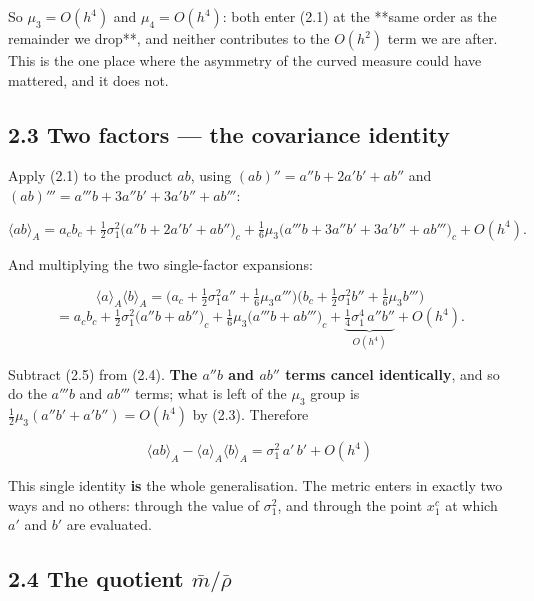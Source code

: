 \documentclass[11pt,a4paper]{article}
\begin{document}
So $\mu_3 = O(h^4)$ and $\mu_4 = O(h^4)$: both enter (2.1) at the **same order as
the remainder we drop**, and neither contributes to the $O(h^2)$ term we are
after. This is the one place where the asymmetry of the curved measure could
have mattered, and it does not.

\subsection*{2.3 Two factors — the covariance identity}

Apply (2.1) to the product $ab$, using
$(ab)''=a''b+2a'b'+ab''$ and
$(ab)'''=a'''b+3a''b'+3a'b''+ab'''$:

\begin{equation*}
\langle ab\rangle_A = a_cb_c
+ \tfrac12\sigma_1^2\big(a''b+2a'b'+ab''\big)_c
+ \tfrac16\mu_3\big(a'''b+3a''b'+3a'b''+ab'''\big)_c
+ O(h^4).
\tag{2.4}
\end{equation*}

And multiplying the two single-factor expansions:

\begin{equation*}
\langle a\rangle_A\langle b\rangle_A
= \Big(a_c+\tfrac12\sigma_1^2a''+\tfrac16\mu_3a'''\Big)
  \Big(b_c+\tfrac12\sigma_1^2b''+\tfrac16\mu_3b'''\Big)
\end{equation*}
\begin{equation*}
= a_cb_c
+ \tfrac12\sigma_1^2\big(a''b+ab''\big)_c
+ \tfrac16\mu_3\big(a'''b+ab'''\big)_c
+ \underbrace{\tfrac14\sigma_1^4\,a''b''}_{O(h^4)}
+ O(h^4).
\tag{2.5}
\end{equation*}

Subtract (2.5) from (2.4). \textbf{The $a''b$ and $ab''$ terms cancel identically},
and so do the $a'''b$ and $ab'''$ terms; what is left of the $\mu_3$ group is
$\tfrac12\mu_3(a''b'+a'b'')=O(h^4)$ by (2.3). Therefore

\begin{equation*}
\boxed{\;\langle ab\rangle_A - \langle a\rangle_A\langle b\rangle_A
= \sigma_1^2\,a'\,b' + O(h^4)\;}
\tag{2.6}
\end{equation*}

This single identity \textbf{is} the whole generalisation. The metric enters in
exactly two ways and no others: through the value of $\sigma_1^2$, and through
the point $x_1^c$ at which $a'$ and $b'$ are evaluated.

\subsection*{2.4 The quotient $\bar m/\bar\rho$}
\end{document}
